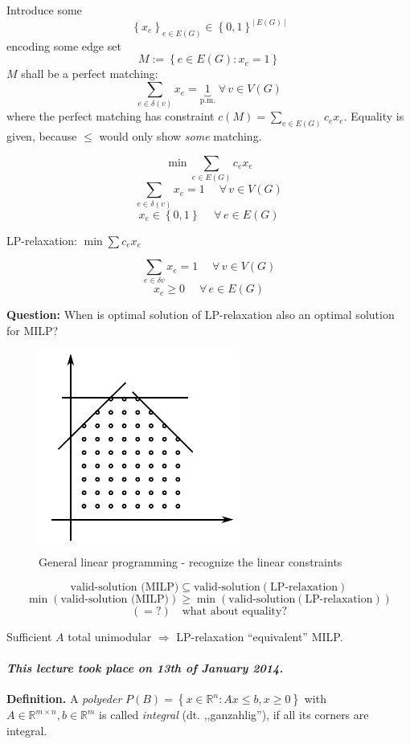 \documentclass{article}
\newcommand{\card}[1]{\left|\:\!#1\:\!\right|}
\newcommand{\set}[1]{\left\{#1\right\}}
\newcommand{\dateref}[1]{\paragraph{\textit{This lecture took place on #1.}}}
\newcommand{\fall}{\;\forall\,}
\begin{document}
Introduce some
\[ \left\{x_e\right\}_{e \in E(G)} \in \set{0,1}^{\card{E(G)}} \]
encoding some edge set
\[ M := \set{e \in E(G): x_e = 1} \]
$M$ shall be a perfect matching:
\[ \sum_{e \in \delta(v)} x_e = \underbrace{1}_{\text{p.m.}} \fall v \in V(G) \]
where the perfect matching has constraint $c(M) = \sum_{e \in E(G)} c_e x_e$.
Equality is given, because $\leq$ would only show \emph{some} matching.

\[
  \min \sum_{e \in E(G)} c_e x_e
\] \[
  \sum_{e \in \delta(v)} x_e = 1 \quad \fall v \in V(G)
\] \[
  x_e \in \set{0, 1} \quad \fall e \in E(G)
\]

LP-relaxation: $\min \sum c_e x_e$

\[
  \sum_{e \in \delta{v}} x_e = 1 \quad \fall v \in V(G)
\] \[
  x_e \geq 0 \quad \fall e \in E(G)
\]

\textbf{Question:} When is optimal solution of LP-relaxation also an optimal solution for MILP?

\begin{figure}
  \begin{center}
    \includegraphics{img/linear_programming.pdf}
    \caption{General linear programming - recognize the linear constraints}
  \end{center}
\end{figure}

\[
  \text{valid-solution (MILP)} \subseteq \text{valid-solution}(\text{LP-relaxation})
\] \[
  \min(\text{valid-solution (MILP)}) \geq \min(\text{valid-solution}(\text{LP-relaxation}))
\] \[
  (= ?)  \quad \text{what about equality?}
\]

Sufficient $A$ total unimodular $\Rightarrow$ LP-relaxation ``equivalent'' MILP.


\dateref{13th of January 2014}

\textbf{Definition.}
  A \emph{polyeder} $P(B) = \set{x \in \mathbb{R}^n: Ax \leq b, x \geq 0}$ with $A \in \mathbb{R}^{m\times n}, b \in \mathbb{R}^m$ is called \emph{integral} (dt. ,,ganzahlig''), if all its corners are integral.
\end{document}
